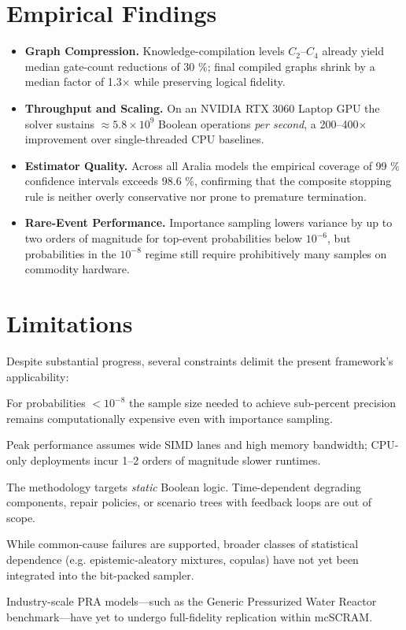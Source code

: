 \section{Empirical Findings}
\label{sec:empirical_findings}

\begin{itemize}
  \item \textbf{Graph Compression.}  Knowledge-compilation levels $C_2$–$C_4$
already yield median gate-count reductions of 30 \%; final compiled graphs
shrink by a median factor of 1.3× while preserving logical fidelity.
  \item \textbf{Throughput and Scaling.}  On an NVIDIA RTX 3060 Laptop GPU the
solver sustains $\approx\!5.8\times10^{9}$ Boolean operations \textit{per second},
a 200–400× improvement over single-threaded CPU baselines.
  \item \textbf{Estimator Quality.}  Across all Aralia models the empirical
coverage of 99 \% confidence intervals exceeds 98.6 \%, confirming that the
composite stopping rule is neither overly conservative nor prone to premature
termination.
  \item \textbf{Rare-Event Performance.}  Importance sampling lowers variance by
up to two orders of magnitude for top-event probabilities below $10^{-6}$, but
probabilities in the $10^{-8}$ regime still require prohibitively many samples
on commodity hardware.
\end{itemize}

\section{Limitations}
\label{sec:limitations}

Despite substantial progress, several constraints delimit the present
framework’s applicability:
\begin{description}[leftmargin=2.5em]
  \item[Ultra-Rare Events] For probabilities $<10^{-8}$ the sample size needed
        to achieve sub-percent precision remains computationally expensive even
        with importance sampling.
  \item[Hardware Dependence] Peak performance assumes wide SIMD lanes and high
        memory bandwidth; CPU-only deployments incur 1–2 orders of magnitude
        slower runtimes.
  \item[Static Graphs] The methodology targets \emph{static} Boolean logic.
        Time-dependent degrading components, repair policies, or scenario trees
        with feedback loops are out of scope.
  \item[Correlation Modeling] While common-cause failures are supported,
        broader classes of statistical dependence (e.g.
        epistemic‐aleatory mixtures, copulas) have not yet been integrated into
        the bit-packed sampler.
  \item[Verification and Validation] Industry-scale PRA models—such as the
        Generic Pressurized Water Reactor benchmark—have yet to undergo
        full-fidelity replication within mcSCRAM.
\end{description}

